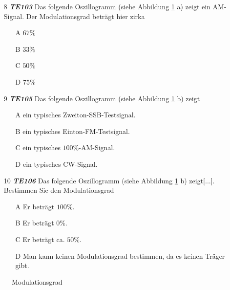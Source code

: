 \begin{enumerate} 
	\item[8] \emph{\textbf{TE103}}  Das folgende Oszillogramm (siehe Abbildung \ref{Modgrad} a) zeigt ein AM-Signal. Der Modulationsgrad beträgt hier zirka
	\begin{enumerate}
	\itemsep1pt\parskip0pt
		\item[A] $67\%$
		\item[B] $33\%$
		\item[C] $50\%$
		\item[D] $75\%$
	\end{enumerate} 
	\item[9] \emph{\textbf{TE105}}   Das folgende Oszillogramm (siehe Abbildung \ref{Modgrad} b) zeigt
	\begin{enumerate}
	\itemsep1pt\parskip0pt
		\item[A] ein typisches Zweiton-SSB-Testsignal.
		\item[B] ein typisches Einton-FM-Testsignal.
		\item[C] ein typisches $100\%$-AM-Signal.
		\item[D] ein typisches CW-Signal.
	\end{enumerate} 
	\item[10] \emph{\textbf{TE106}}   Das folgende Oszillogramm (siehe Abbildung \ref{Modgrad} b) zeigt[...]. Bestimmen Sie den Modulationsgrad
	\begin{enumerate}
	\itemsep1pt\parskip0pt
		\item[A] Er beträgt $100\%$.
		\item[B] Er beträgt $0\%$.
		\item[C] Er beträgt ca. $50\%$.
		\item[D] Man kann keinen Modulationsgrad bestimmen, da es keinen Träger gibt.
	\end{enumerate} 
\end{enumerate} 

\begin{figure}[H]
	\centering
	\caption{Modulationsgrad}
	\label{Modgrad}
\end{figure}